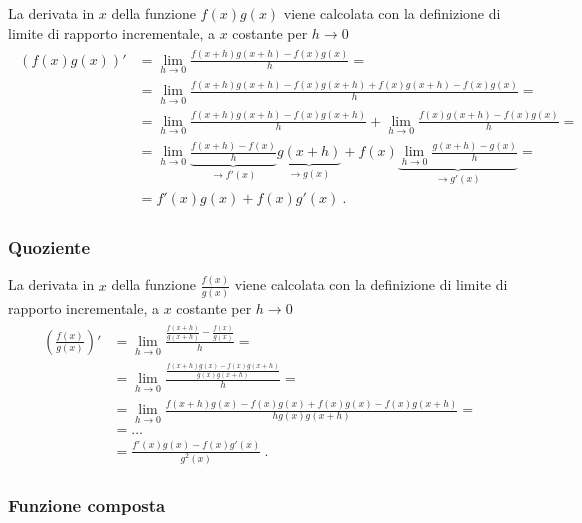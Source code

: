 \documentclass[letterpaper,10pt,italian]{jupyterBook}
\begin{document}
\sphinxAtStartPar
La derivata in \(x\) della funzione \(f(x) g(x)\) viene calcolata con la definizione di limite di rapporto incrementale, a \(x\) costante per \(h \rightarrow 0\)
\begin{equation*}
\begin{split}\begin{aligned}
  \left( f(x) g(x) \right)' 
  & = \lim_{h \rightarrow 0} \frac{f(x+h) g(x+h) - f(x) g(x)}{h} = \\
  & = \lim_{h \rightarrow 0} \frac{f(x+h) g(x+h) - f(x)g(x+h) + f(x)g(x+h) - f(x) g(x)}{h} = \\
  & = \lim_{h \rightarrow 0} \frac{f(x+h) g(x+h) - f(x)g(x+h)}{h} + \lim_{h\rightarrow 0} \frac{f(x)g(x+h) - f(x) g(x)}{h} = \\
  & = \lim_{h \rightarrow 0} \underbrace{\frac{f(x+h) - f(x)}{h}}_{\rightarrow f'(x)} \underbrace{g(x+h)}_{\rightarrow g(x)} + f(x) \underbrace{\lim_{h\rightarrow 0} \frac{g(x+h) - g(x)}{h}}_{\rightarrow g'(x)} = \\
  & = f'(x) g(x) + f(x) g'(x) \ .
\end{aligned}\end{split}
\end{equation*}\subsubsection*{Quoziente}

\sphinxAtStartPar
La derivata in \(x\) della funzione \(\frac{f(x)}{g(x)}\) viene calcolata con la definizione di limite di rapporto incrementale, a \(x\) costante per \(h \rightarrow 0\)
\begin{equation*}
\begin{split}\begin{aligned}
  \left( \frac{f(x)}{ g(x)} \right)' 
  & = \lim_{h \rightarrow 0} \frac{ \frac{f(x+h)}{g(x+h)} - \frac{f(x)}{g(x)}}{h} = \\
  & = \lim_{h \rightarrow 0} \frac{\frac{f(x+h) g(x) - f(x) g(x+h)}{g(x) g(x+h)}}{h} = \\
  & = \lim_{h \rightarrow 0} \frac{f(x+h) g(x) - f(x) g(x) + f(x) g(x) - f(x) g(x+h)}{h g(x) g(x+h)} = \\
  & = \dots \\
  & = \frac{f'(x) g(x) - f(x) g'(x)}{g^2(x)} \ .
\end{aligned}\end{split}
\end{equation*}\subsubsection*{Funzione composta}
\end{document}
